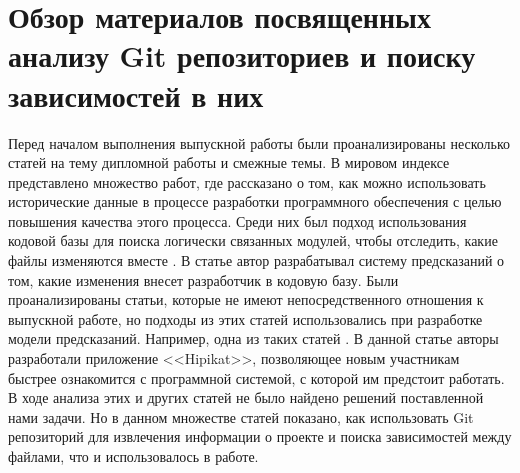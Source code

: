 \section{Обзор материалов посвященных анализу Git репозиториев и поиску зависимостей в них}
Перед началом выполнения выпускной работы были проанализированы несколько статей на тему дипломной работы и смежные темы. В мировом индексе представлено множество работ, где рассказано о том, как можно использовать исторические данные в процессе разработки программного обеспечения с целью повышения качества этого процесса. Среди них был подход использования кодовой базы для поиска логически связанных модулей, чтобы отследить, какие файлы изменяются вместе \cite{logical-modules}. В статье \cite{source-change} автор разрабатывал систему предсказаний о том, какие изменения внесет разработчик в кодовую базу. Были проанализированы статьи, которые не имеют непосредственного отношения к выпускной работе, но подходы из этих статей использовались при разработке модели предсказаний. Например, одна из таких статей \cite{project-memory}. В данной статье авторы разработали приложение <<Hipikat>>, позволяющее новым участникам быстрее ознакомится с программной системой, с которой им предстоит работать. В ходе анализа этих и других статей не было найдено решений поставленной нами задачи. Но в данном множестве статей показано, как использовать Git репозиторий для извлечения информации о проекте и поиска зависимостей между файлами, что и использовалось в работе.

\chapterconclusion
